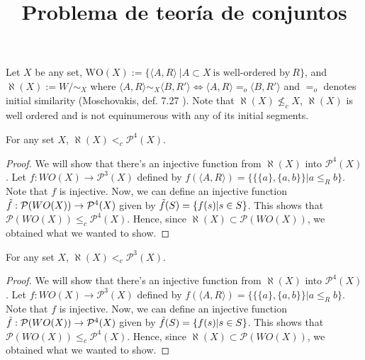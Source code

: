 \documentclass{article}
\title{Problema de teoría de conjuntos}
\begin{document}
	

\begin{definition}\label{aleph}
    Let $X$ be any set, $\text{WO}(X):=\{\langle A,R\rangle\ |A\subset X \ \text{is well-ordered by}\ R\}$, 
    and $\aleph(X):= W/{\sim_X}$ 
    where $\langle A,R\rangle \sim_X \langle B, R'\rangle \Longleftrightarrow \langle A, R\rangle =_o \langle B, R'\rangle$ and $=_o$ denotes initial similarity (Moschovakis, def. 7.27 \cite{Moscho}).
    Note that $\aleph(X)\nleq_c X$, $\aleph(X)$ is well ordered and is not equinumerous with any of its initial segments.
\end{definition}


\begin{theorem}
	For any set $X$, $\aleph(X)<_c \mathcal{P}^4(X)$.
\end{theorem}

\begin{proof}
We will show that there's an injective function from $\aleph(X)$ into $\mathcal{P}^4(X)$. Let $f:WO(X)\rightarrow \mathcal{P}^3(X)$ defined by $f(\langle A,R\rangle) = \{\{\{a\},\{a,b\}\}| a\leq_R b\}$. Note that $f$ is injective. Now, we can define an injective function $\Tilde{f}: \mathcal{P} (WO(X)) \rightarrow \mathcal{P}^4(X)$ given by $\Tilde{f}(S) = \{f(s) | s\in S\}$. This shows that $\mathcal{P} (WO(X)) \leq_c \mathcal{P}^4(X)$. Hence, since $\aleph (X) \subset \mathcal{P} (WO(X))$, we obtained what we wanted to show.
\end{proof}

\begin{theorem}
	For any set $X$, $\aleph(X)<_c \mathcal{P}^3(X)$.
\end{theorem}
\begin{proof}
	We will show that there's an injective function from $\aleph(X)$ into $\mathcal{P}^4(X)$. Let $f:WO(X)\rightarrow \mathcal{P}^3(X)$ defined by $f(\langle A,R\rangle) = \{\{\{a\},\{a,b\}\}| a\leq_R b\}$. Note that $f$ is injective. Now, we can define an injective function $\Tilde{f}: \mathcal{P} (WO(X)) \rightarrow \mathcal{P}^4(X)$ given by $\Tilde{f}(S) = \{f(s) | s\in S\}$. This shows that $\mathcal{P} (WO(X)) \leq_c \mathcal{P}^4(X)$. Hence, since $\aleph (X) \subset \mathcal{P} (WO(X))$, we obtained what we wanted to show.
\end{proof}
\end{document}
